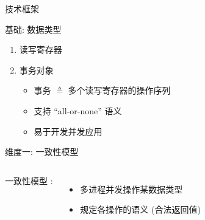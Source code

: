 \begin{frame}{技术框架}
\end{frame}
\begin{frame}{基础: 数据类型}
	\begin{enumerate}
	  \setlength{\itemsep}{8pt}
	  \item 读写寄存器
	  \item 事务对象
		\begin{itemize}
		  \setlength{\itemsep}{4pt}
		  \item 事务 $\triangleq$ 多个读写寄存器的操作序列
		  \item 支持 ``all-or-none'' 语义
		  \item 易于开发并发应用
		\end{itemize}
	\end{enumerate}
\end{frame}
\begin{frame}{维度一: 一致性模型}
  \begin{columns}
	  一致性模型  :
	  \vspace{0.20cm}
	  \begin{itemize}
		\item 多进程并发操作某数据类型
		\item 规定各操作的语义 {\small (合法返回值)}
	  \end{itemize}
  \end{columns}

\end{frame}
